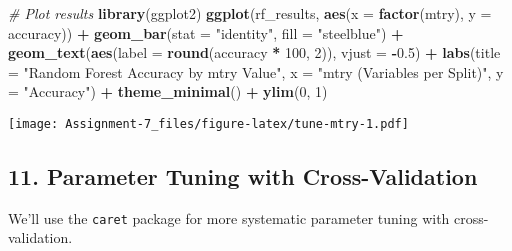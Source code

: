 \documentclass[
]{article}
\newenvironment{Shaded}{\begin{snugshade}}{\end{snugshade}}
\newcommand{\AttributeTok}[1]{\textcolor[rgb]{0.13,0.29,0.53}{#1}}
\newcommand{\CommentTok}[1]{\textcolor[rgb]{0.56,0.35,0.01}{\textit{#1}}}
\newcommand{\DecValTok}[1]{\textcolor[rgb]{0.00,0.00,0.81}{#1}}
\newcommand{\FloatTok}[1]{\textcolor[rgb]{0.00,0.00,0.81}{#1}}
\newcommand{\FunctionTok}[1]{\textcolor[rgb]{0.13,0.29,0.53}{\textbf{#1}}}
\newcommand{\NormalTok}[1]{#1}
\newcommand{\SpecialCharTok}[1]{\textcolor[rgb]{0.81,0.36,0.00}{\textbf{#1}}}
\newcommand{\StringTok}[1]{\textcolor[rgb]{0.31,0.60,0.02}{#1}}
\begin{document}
\begin{Shaded}
\begin{Highlighting}[]
\CommentTok{\# Plot results}
\FunctionTok{library}\NormalTok{(ggplot2)}
\FunctionTok{ggplot}\NormalTok{(rf\_results, }\FunctionTok{aes}\NormalTok{(}\AttributeTok{x =} \FunctionTok{factor}\NormalTok{(mtry), }\AttributeTok{y =}\NormalTok{ accuracy)) }\SpecialCharTok{+}
  \FunctionTok{geom\_bar}\NormalTok{(}\AttributeTok{stat =} \StringTok{"identity"}\NormalTok{, }\AttributeTok{fill =} \StringTok{"steelblue"}\NormalTok{) }\SpecialCharTok{+}
  \FunctionTok{geom\_text}\NormalTok{(}\FunctionTok{aes}\NormalTok{(}\AttributeTok{label =} \FunctionTok{round}\NormalTok{(accuracy }\SpecialCharTok{*} \DecValTok{100}\NormalTok{, }\DecValTok{2}\NormalTok{)), }\AttributeTok{vjust =} \SpecialCharTok{{-}}\FloatTok{0.5}\NormalTok{) }\SpecialCharTok{+}
  \FunctionTok{labs}\NormalTok{(}\AttributeTok{title =} \StringTok{"Random Forest Accuracy by mtry Value"}\NormalTok{,}
       \AttributeTok{x =} \StringTok{"mtry (Variables per Split)"}\NormalTok{,}
       \AttributeTok{y =} \StringTok{"Accuracy"}\NormalTok{) }\SpecialCharTok{+}
  \FunctionTok{theme\_minimal}\NormalTok{() }\SpecialCharTok{+}
  \FunctionTok{ylim}\NormalTok{(}\DecValTok{0}\NormalTok{, }\DecValTok{1}\NormalTok{)}
\end{Highlighting}
\end{Shaded}

\texttt{[image: Assignment-7\_files/figure-latex/tune-mtry-1.pdf]}

\subsection{11. Parameter Tuning with
Cross-Validation}\label{parameter-tuning-with-cross-validation}

We'll use the \texttt{caret} package for more systematic parameter
tuning with cross-validation.
\end{document}
